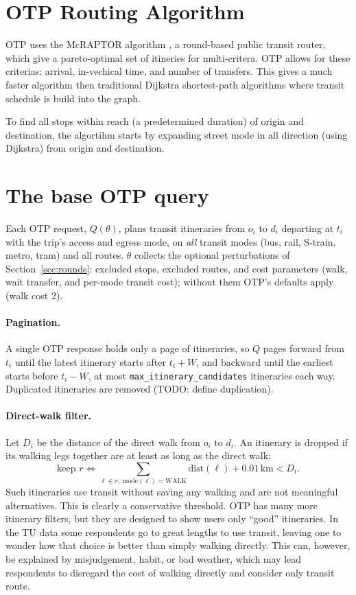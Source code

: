 \documentclass[11pt,a4paper]{article}
\newcommand{\code}[1]{\texttt{#1}}
\begin{document}
\section{OTP Routing Algorithm}
OTP uses the McRAPTOR algorithm \parencite{RAPTOR}, a round-based public transit router, which give a pareto-optimal set of itineries for multi-critera. OTP allows for these criterias: arrival, in-vechical time, and number of transfers. This gives a much faster algorithm then traditional Dijkstra shortest-path algorithms where transit schedule is build into the graph. 

To find all stops within reach (a predetermined duration) of origin and destination, the algortihm starts by expanding street mode in all direction (using Dijkstra) from origin and destination. 



\section{The base OTP query}
\label{sec:query}

Each OTP request, $Q(\theta)$, plans transit itineraries from $o_i$ to $d_i$ departing at $t_i$ with
the trip's access and egress mode, on \emph{all} transit modes (bus, rail, S-train, metro, tram) and
all routes. $\theta$ collects the optional perturbations of Section~\ref{sec:rounds}: excluded stops,
excluded routes, and cost parameters (walk, wait transfer, and per-mode transit cost);
without them OTP's defaults apply (walk cost 2).

\paragraph{Pagination.} A single OTP response holds only a page of itineraries, so $Q$ pages forward
from $t_i$ until the latest itinerary starts after $t_i + W$, and backward until the earliest starts
before $t_i - W$, at most \code{max\_itinerary\_candidates} itineraries each way. Duplicated itineraries are removed (TODO: define duplication).

\paragraph{Direct-walk filter.} Let $D_i$ be the distance of the direct walk from $o_i$ to $d_i$. An
itinerary is dropped if its walking legs together are at least as long as the direct walk:
\begin{equation}
  \text{keep } r \iff \sum_{\ell \in r,\ \text{mode}(\ell)=\text{WALK}} \text{dist}(\ell) + 0.01\,\text{km} < D_i .
\end{equation}
Such itineraries use transit without saving any walking and are not meaningful alternatives. This is
clearly a conservative threshold. OTP has many more itinerary filters, but they are designed to show
users only ``good'' itineraries. In the TU data some respondents go to great lengths to use transit,
leaving one to wonder how that choice is better than simply walking directly. This can, however, be
explained by misjudgement, habit, or bad weather, which may lead respondents to disregard the cost of
walking directly and consider only transit route.
\end{document}
